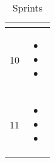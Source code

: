 \documentclass{scrartcl}
\begin{document}
\begin{table}[H]
\begin{center}
\begin{tabular}{| p{2.5cm}| p{12cm} |}
\begin{itemize}
\end{itemize}\\ \hline
 
  10                &             
\begin{itemize}
\item 
\item
\item


 \end{itemize}\\ \hline
 
  11                &             
\begin{itemize}
\item 
\item
\item

 \end{itemize}\\ \hline
 
 
 \end{tabular}
\end{center}
\caption{Sprints}
\label{table2}
\end{table}
 
 
 \pagebreak
\end{document}
